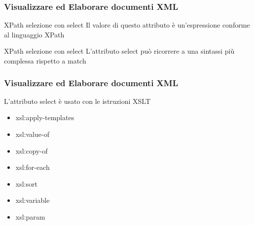 
\begin{frame}
    \frametitle{Visualizzare ed Elaborare documenti XML}
    \addtocounter{nframe}{1}
    

    \begin{block}{XPath selezione con select}
        Il valore di questo attributo è un'espressione conforme al linguaggio XPath
    \end{block}

    \begin{block}{XPath selezione con select}
        L'attributo select può ricorrere a una sintassi più complessa rispetto a match
    \end{block}
    
\end{frame}

\begin{frame}
    \frametitle{Visualizzare ed Elaborare documenti XML}
    \addtocounter{nframe}{1}
    

    \begin{block}{L’attributo select è usato con le istruzioni XSLT}
        \begin{itemize}
            \item xsl:apply-templates
            \item xsl:value-of
            \item xsl:copy-of
            \item xsl:for-each
            \item xsl:sort
            \item xsl:variable
            \item xsl:param
        \end{itemize}
    \end{block}

\end{frame}

